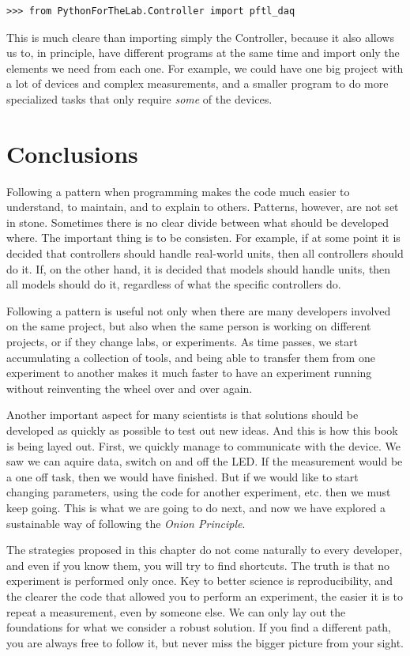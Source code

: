 \begin{verbatim}
>>> from PythonForTheLab.Controller import pftl_daq
\end{verbatim}

This is much cleare than importing simply the Controller, because it also allows us to, in principle, have different programs at the same time and import only the elements we need from each one. For example, we could have one big project with a lot of devices and complex measurements, and a smaller program to do more specialized tasks that only require \emph{some} of the devices. 

\section{Conclusions}\label{section:layout-conclusions}
Following a pattern when programming makes the code much easier to understand, to maintain, and to explain to others. Patterns, however, are not set in stone. Sometimes there is no clear divide between what should be developed where. The important thing is to be consisten. For example, if at some point it is decided that controllers should handle real-world units, then all controllers should do it. If, on the other hand, it is decided that models should handle units, then all models should do it, regardless of what the specific controllers do. 

Following a pattern is useful not only when there are many developers involved on the same project, but also when the same person is working on different projects, or if they change labs, or experiments. As time passes, we start accumulating a collection of tools, and being able to transfer them from one experiment to another makes it much faster to have an experiment running without reinventing the wheel over and over again. 

Another important aspect for many scientists is that solutions should be developed as quickly as possible to test out new ideas. And this is how this book is being layed out. First, we quickly manage to communicate with the device. We saw we can aquire data, switch on and off the LED. If the measurement would be a one off task, then we would have finished. But if we would like to start changing parameters, using the code for another experiment, etc. then we must keep going. This is what we are going to do next, and now we have explored a sustainable way of following the \emph{Onion Principle}.

The strategies proposed in this chapter do not come naturally to every developer, and even if you know them, you will try to find shortcuts. The truth is that no experiment is performed only once. Key to better science is reproducibility, and the clearer the code that allowed you to perform an experiment, the easier it is to repeat a measurement, even by someone else. We can only lay out the foundations for what we consider a robust solution. If you find a different path, you are always free to follow it, but never miss the bigger picture from your sight. 

